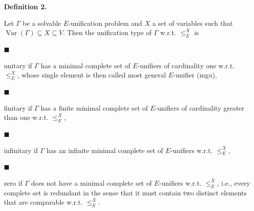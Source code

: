 \documentclass[10pt,a4paper]{amsart}
\begin{document}
 
 
\par\medskip\noindent\textbf{Definition 2.}\par
 
 
Let $\Gamma$ be a solvable $E$-unification problem and $X$ a set of variables such that $\operatorname{Var}(\Gamma)\subseteq X\subseteq V$. Then the unification type of $\Gamma$ w.r.t. $\leq_{E}^{X}$ is\par
  
\par\noindent  $\blacksquare$ 
 
unitary if $\Gamma$ has a minimal complete set of $E$-unifiers of cardinality one w.r.t. $\leq_{E}^{X}$, whose single element is then called most general $E$-unifier (mgu),\par
 
 
 
\par\noindent  $\blacksquare$ 
 
finitary if $\Gamma$ has a finite minimal complete set of $E$-unifiers of cardinality greater than one w.r.t. $\leq_{E}^{X}$,\par
 
 
 
\par\noindent  $\blacksquare$ 
 
infinitary if $\Gamma$ has an infinite minimal complete set of $E$-unifiers w.r.t. $\leq_{E}^{X}$,\par
 
 
 
\par\noindent  $\blacksquare$ 
 
zero if $\Gamma$ does not have a minimal complete set of $E$-unifiers w.r.t. $\leq_{E}^{X}$, i.e., every complete set is redundant in the sense that it must contain two distinct elements that are comparable w.r.t. $\leq_{E}^{X}$.\par
 
 
  
 
 
 
\end{document}

